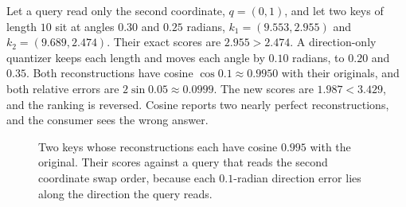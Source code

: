 \begin{example}\label{ex:ch07:cosine}
Let a query read only the second coordinate, $q=(0,1)$, and let two keys of length $10$ sit at angles $0.30$ and $0.25$ radians, $k_1=(9.553,2.955)$ and $k_2=(9.689,2.474)$. Their exact scores are $2.955>2.474$. A direction-only quantizer keeps each length and moves each angle by $0.10$ radians, to $0.20$ and $0.35$. Both reconstructions have cosine $\cos0.1\approx0.9950$ with their originals, and both relative errors are $2\sin0.05\approx0.0999$. The new scores are $1.987<3.429$, and the ranking is reversed. Cosine reports two nearly perfect reconstructions, and the consumer sees the wrong answer.
\end{example}

\begin{figure}[tbp]\centering
{}
\caption{Two keys whose reconstructions each have cosine $0.995$ with the original. Their scores against a query that reads the second coordinate swap order, because each $0.1$-radian direction error lies along the direction the query reads.}
\label{fig:ch07:cosine}
\end{figure}

